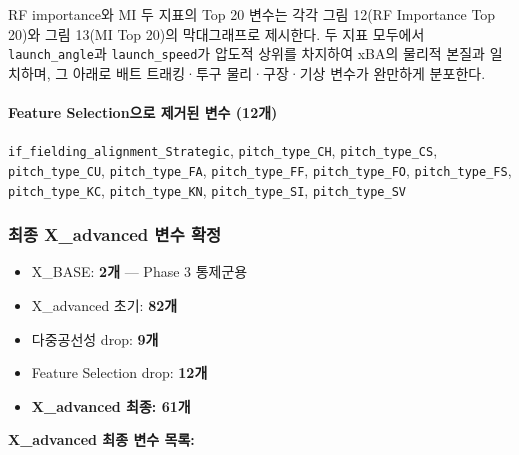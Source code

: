 \documentclass[
  11.5pt,
]{article}
\providecommand{\tightlist}{%
  \setlength{\itemsep}{0pt}\setlength{\parskip}{0pt}}
\begin{document}
RF importance와 MI 두 지표의 Top 20 변수는 각각 그림 12(RF Importance
Top 20)와 그림 13(MI Top 20)의 막대그래프로 제시한다. 두 지표 모두에서
\texttt{launch\_angle}과 \texttt{launch\_speed}가 압도적 상위를 차지하여
xBA의 물리적 본질과 일치하며, 그 아래로 배트 트래킹·투구 물리·구장·기상
변수가 완만하게 분포한다.

\paragraph{Feature Selection으로 제거된 변수
(12개)}\label{feature-selectionuxc73cuxb85c-uxc81cuxac70uxb41c-uxbcc0uxc218-12uxac1c}

\texttt{if\_fielding\_alignment\_Strategic}, \texttt{pitch\_type\_CH},
\texttt{pitch\_type\_CS}, \texttt{pitch\_type\_CU},
\texttt{pitch\_type\_FA}, \texttt{pitch\_type\_FF},
\texttt{pitch\_type\_FO}, \texttt{pitch\_type\_FS},
\texttt{pitch\_type\_KC}, \texttt{pitch\_type\_KN},
\texttt{pitch\_type\_SI}, \texttt{pitch\_type\_SV}

\subsubsection{최종 X\_advanced 변수
확정}\label{uxcd5cuxc885-x_advanced-uxbcc0uxc218-uxd655uxc815}

\begin{itemize}
\tightlist
\item
  X\_BASE: \textbf{2개} --- Phase 3 통제군용
\item
  X\_advanced 초기: \textbf{82개}
\item
  다중공선성 drop: \textbf{9개}
\item
  Feature Selection drop: \textbf{12개}
\item
  \textbf{X\_advanced 최종: 61개}
\end{itemize}

\textbf{X\_advanced 최종 변수 목록:}
\end{document}
